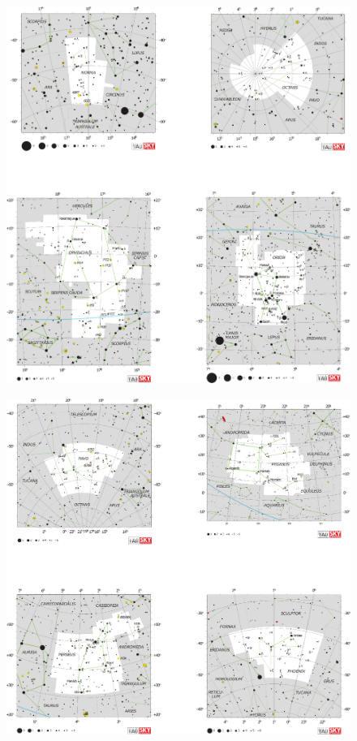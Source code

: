 \documentclass[a4paper,12pt]{extarticle}
\begin{document}
\clearpage
\begin{figure}
	\centering
	\includegraphics[width=\linewidth]{C15.eps}
\end{figure}
\begin{figure}
	\centering
	\includegraphics[width=\linewidth]{C16.eps}
\end{figure}
\end{document}
